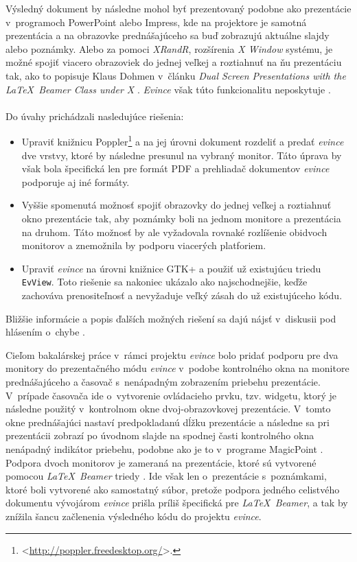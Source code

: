 \documentclass[12pt,oneside,final]{fithesis2}
\begin{document}
Výsledný dokument by následne mohol byť prezentovaný podobne ako prezentácie v~programoch PowerPoint alebo Impress, kde na projektore je samotná prezentácia a na obrazovke prednášajúceho sa buď zobrazujú aktuálne slajdy alebo poznámky. Alebo za pomoci \emph{XRandR}, rozšírenia \emph{X Window} systému, je možné spojiť viacero obrazoviek do jednej veľkej a roztiahnuť na ňu prezentáciu tak, ako to popisuje Klaus Dohmen v~článku \emph{Dual Screen Presentations with the \LaTeX~Beamer Class under X} \cite{dohmen}. \emph{Evince} však túto funkcionalitu neposkytuje \cite{evbug}.
\\
\\
Do úvahy prichádzali nasledujúce riešenia:
\begin{itemize}
\item Upraviť knižnicu Poppler\footnote{<\url{http://poppler.freedesktop.org/}>.} a na jej úrovni dokument rozdeliť a predať \emph{evince} dve vrstvy, ktoré by následne presunul na vybraný monitor. Táto úprava by však bola špecifická len pre formát PDF a prehliadač dokumentov \emph{evince} podporuje aj iné formáty.
\item Vyššie spomenutá možnosť spojiť obrazovky do jednej veľkej a roztiahnuť okno prezentácie tak, aby poznámky boli na jednom monitore a prezentácia na druhom. Táto možnosť by ale vyžadovala rovnaké rozlíšenie obidvoch monitorov a znemožnila by podporu viacerých platforiem.
\item Upraviť \emph{evince} na úrovni knižnice GTK+ a použiť už existujúcu triedu \texttt{EvView}. Toto riešenie sa nakoniec ukázalo ako najschodnejšie, keďže zachováva prenositeľnosť a nevyžaduje veľký zásah do už existujúceho kódu.
\end{itemize}

Bližšie informácie a popis ďalších možných riešení sa dajú nájsť v~diskusii pod hlásením o~chybe \cite{evbug}.

Cieľom bakalárskej práce v~rámci projektu \emph{evince} bolo pridať podporu pre dva monitory do prezentačného módu \emph{evince} v~podobe kontrolného okna na monitore prednášajúceho a časovač s~nenápadným zobrazením priebehu prezentácie.  V~prípade časovača ide o~vytvorenie ovládacieho prvku, tzv. widgetu, ktorý je následne použitý v~kontrolnom okne dvoj-obrazovkovej prezentácie. V~tomto okne prednášajúci nastaví predpokladanú dĺžku prezentácie a následne sa pri prezentácii zobrazí po úvodnom slajde na spodnej časti kontrolného okna nenápadný indikátor priebehu, podobne ako je to v~programe MagicPoint \cite{mgp}. Podpora dvoch monitorov je zameraná na prezentácie, ktoré sú vytvorené pomocou \emph{\LaTeX~Beamer} triedy \cite{beamer}. Ide však len o~prezentácie s~poznámkami, ktoré boli vytvorené ako samostatný súbor, pretože podpora jedného celistvého dokumentu vývojárom \emph{evince} prišla príliš špecifická pre \emph{\LaTeX~Beamer}, a tak by znížila šancu začlenenia výsledného kódu do projektu \emph{evince}.
\end{document}
